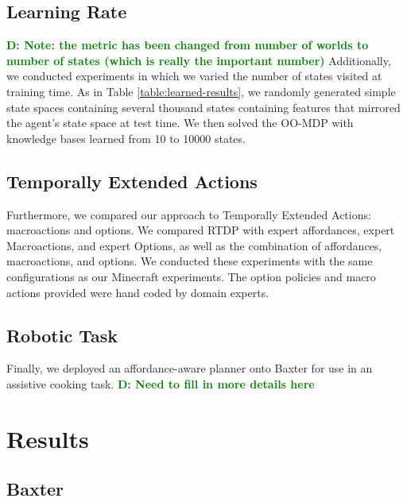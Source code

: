 \documentclass[conference]{IEEEtran}
\newcommand{\dnote}[1]{\textcolor{Green}{\textbf{D: #1}}}
\begin{document}
\subsection{Learning Rate}
\dnote{Note: the metric has been changed from number of worlds to number of
states (which is really the important number)} Additionally, we conducted 
experiments in which we varied the number of states visited at training time. 
As in Table \ref{table:learned-results}, we randomly generated simple state spaces
containing several thousand states containing features that mirrored the agent's state
space at test time. We then solved the OO-MDP with knowledge bases learned from 
10 to 10000 states.

\subsection{Temporally Extended Actions}
Furthermore, we compared our approach to Temporally Extended Actions: 
macroactions and options. We compared RTDP with expert affordances, 
expert Macroactions, and expert Options, as well as the combination of 
affordances, macroactions, and options. We conducted these experiments 
with the same configurations as our Minecraft experiments. The option policies
and macro actions provided were hand coded by domain experts.

\subsection{Robotic Task}
Finally, we deployed an affordance-aware planner onto Baxter for use
in an assistive cooking task. \dnote{Need to fill in more details here}

\section{Results}
\label{sec:results}

\subsection{Baxter}
\end{document}
